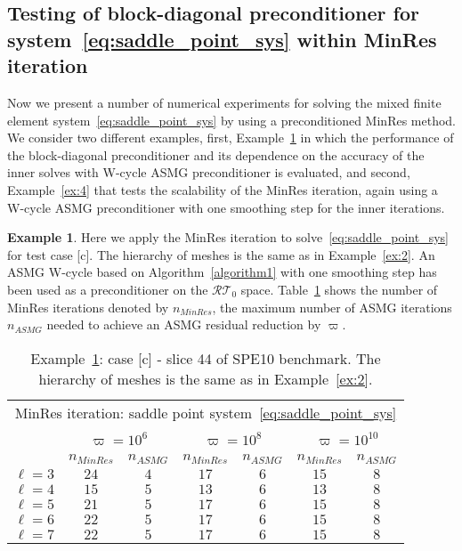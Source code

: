 \documentclass[11pt]{amsart}
\numberwithin{equation}{section}
\theoremstyle{definition}\newtheorem{example}{Example}[section]
\begin{document}
\subsection{Testing of block-diagonal preconditioner for system~\eqref{eq:saddle_point_sys}
within MinRes iteration}\label{sec:saddle_point_sys}
Now we present a number of numerical experiments for solving the mixed finite element
system~\eqref{eq:saddle_point_sys} by using
a preconditioned MinRes method.
We consider two different examples, first, Example~\ref{ex:3} in which the performance
of the block-diagonal preconditioner and its dependence on the accuracy of the inner
solves with W-cycle ASMG preconditioner is evaluated, and second, 
Example~\ref{ex:4}
that tests the scalability of the MinRes iteration, again using a W-cycle ASMG preconditioner
with one smoothing step for the inner iterations.
\begin{example}\label{ex:3} 
  Here we apply the MinRes iteration to
  solve~\eqref{eq:saddle_point_sys} for test case [c]. The hierarchy 
  of meshes is the same as in Example~\ref{ex:2}. 
An ASMG W-cycle
  based on Algorithm~\ref{algorithm1} with one smoothing step has been
  used as a preconditioner on the ${{\mathcal{RT}}_{{0}}}$
  space. Table~\ref{table:c44_saddle_W_m1} shows the number of MinRes
  iterations denoted by $n_{MinRes}$, the
  maximum number of ASMG iterations $n_{ASMG}$ needed to achieve an
  ASMG residual reduction by $\varpi$. 
\end{example}
\begin{table}[ht!]
 \begin{center}
 \begin{tabular}{c |  c  c  | c c | c c }
 \multicolumn {7}{c}{MinRes iteration: saddle point system~\eqref{eq:saddle_point_sys}} \\
\multicolumn{1}{c}{~} & \multicolumn{2}{c|}{$\varpi=10^6$} & \multicolumn{2}{c|}{$\varpi=10^8$} 
& \multicolumn{2}{c}{$\varpi=10^{10}$}
 \\
\cline{2-7}
&  $n_{MinRes}$ & $n_{ASMG}$ 
& $n_{MinRes}$ & $n_{ASMG}$  
& $n_{MinRes}$ & $n_{ASMG}$  
\\
\hline 
$\ell = 3$ & $24$ & $4$ 
& $17$ & $6$ 
& $15$ & $8$ 
\\ 
$\ell = 4$ & $15$ & $5$ 
& $13$ & $6$ 
& $13$ & $8$ 
\\
$\ell = 5$ & $21$ & $5$ 
& $17$ & $6$ 
& $15$ & $8$ 
\\
$\ell = 6$ & $22$ & $5$ 
& $17$ & $6$ 
& $15$ & $8$ 
\\
$\ell = 7$ & $22$ & $5$ 
& $17$ & $6$ 
& $15$ & $8$ 
\\
\end{tabular} \vspace{2ex}
\caption{Example~\ref{ex:3}: case [c] - slice 44 of SPE10 benchmark. The hierarchy 
  of meshes is the same as in Example~\ref{ex:2}.}\label{table:c44_saddle_W_m1}
 \end{center}
\end{table}
\end{document}
